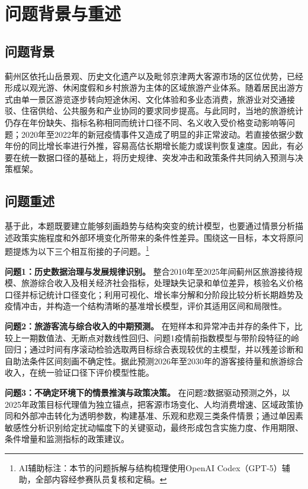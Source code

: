 \documentclass[withoutpreface,bwprint]{cumcmthesis}
\begin{document}
\section{问题背景与重述}
\subsection{问题背景}

蓟州区依托山岳景观、历史文化遗产以及毗邻京津两大客源市场的区位优势，已经形成以观光游、休闲度假和乡村旅游为主体的区域旅游产业体系。随着居民出游方式由单一景区游览逐步转向短途休闲、文化体验和多业态消费，旅游业对交通接驳、住宿供给、公共服务和产业协同的要求同步提高。与此同时，当地的旅游统计仍存在年份缺失、指标名称相同而统计口径不同、名义收入受价格变动影响等问题；2020年至2022年的新冠疫情事件又造成了明显的非正常波动。若直接依据少数年份的同比增长率进行外推，容易高估长期增长能力或误判恢复速度。因此，有必要在统一数据口径的基础上，将历史规律、突发冲击和政策条件共同纳入预测与决策框架。


\subsection{问题重述}

基于此，本题既要建立能够刻画趋势与结构突变的统计模型，也要通过情景分析描述政策实施程度和外部环境变化所带来的条件性差异。围绕这一目标，本文将原问题提炼为以下三个相互衔接的子问题。\footnote{AI辅助标注：本节的问题拆解与结构梳理使用OpenAI Codex（GPT-5）辅助，全部内容经参赛队员复核和定稿\cite{openaiCodex2026}。}

\textbf{问题1：历史数据治理与发展规律识别。}
整合2010年至2025年间蓟州区旅游接待规模、旅游综合收入及相关经济社会指标，处理缺失记录和单位差异，核验名义价格口径并标记统计口径变化；利用可视化、增长率分解和分阶段比较分析长期趋势及疫情冲击，并构造一个结构清晰的基准增长模型，评价其适用区间和局限性。

\textbf{问题2：旅游客流与综合收入的中期预测。}
在短样本和异常冲击并存的条件下，比较上一期数值法、无断点对数线性回归、问题1疫情前指数模型与带阶段特征的岭回归；通过时间有序滚动检验选取两目标综合表现较优的主模型，并以残差诊断和自助法条件区间刻画不确定性。据此预测2026年至2030年的游客接待量和旅游综合收入，在统一验证口径下评价模型性能。

\textbf{问题3：不确定环境下的情景推演与政策决策。}
在问题2数据驱动预测之外，以2025年政策目标代理值为独立锚点，把客源市场变化、人均消费增速、区域政策协同和外部冲击转化为透明参数，构建基准、乐观和悲观三类条件情景；通过单因素敏感性分析识别给定扰动幅度下的关键驱动，最终形成包含实施力度、作用期限、条件增量和监测指标的政策建议。
\end{document}
